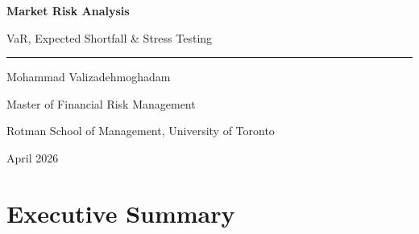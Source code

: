 \documentclass[11pt, a4paper]{article}
\begin{document}
\begin{titlepage}
\centering
\vspace*{3cm}
{\Huge\bfseries Market Risk Analysis \par}
\vspace{0.5cm}
{\Large VaR, Expected Shortfall \& Stress Testing \par}
\vspace{1cm}
\textcolor{darkblue}{\rule{0.6\textwidth}{1.5pt}}
\vspace{1cm}

{\large Mohammad Valizadehmoghadam \par}
\vspace{0.3cm}
{\normalsize Master of Financial Risk Management \par}
{\normalsize Rotman School of Management, University of Toronto \par}
\vspace{1cm}
{\normalsize April 2026 \par}

\vspace{2cm}
\begin{abstract}
\noindent
This report presents a full market risk measurement framework 
applied to a mixed long/short portfolio of equity, investment 
grade credit, high yield credit, and US Treasury instruments. 
The analysis covers instrument pricing under continuous 
compounding, first-order sensitivity analysis, historical 
simulation Value-at-Risk and Expected Shortfall over a 
two-year market data window spanning 2021 to 2022, VaR 
model backtesting, and stress testing under a severely 
adverse macro scenario. Supplementary analysis includes 
DV01 by tenor, risk factor correlation structure, and 
regulatory capital scaling under the Fundamental Review 
of the Trading Book. The portfolio is found to be 
predominantly a credit risk book despite its apparent 
diversification, with credit spread sensitivity 
approximately twelve times larger than rate sensitivity. 
Under a 2008-style stress scenario the portfolio loses 
\$410,371, forty-three times the statistical one-day VaR 
of \$9,485 --- a gap that illustrates the complementary 
role of scenario-based and statistical risk measures in 
modern risk management.
\end{abstract}
\end{titlepage}

\tableofcontents
\newpage

\section{Executive Summary}
\end{document}
